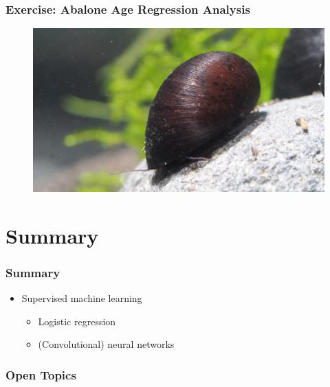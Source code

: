 \documentclass[aspectratio=169]{beamer}
\newcommand\imageright[1]{ %
    \caption*{\scalebox{.5}{\textcolor{lightgray}{\textcopyright~#1}}} %
}
\begin{document}
\begin{frame}
    \frametitle{Exercise: Abalone Age Regression Analysis}
    \begin{figure}
        \centering
        \includegraphics[width=0.7\linewidth]{abalone.jpg}
        \imageright{Garnelaxia}
    \end{figure}
\end{frame}

\section{Summary}
\label{sec:summary}

\begin{frame}
\frametitle{Summary}

\begin{itemize}
    \item Supervised machine learning
    \begin{itemize}
        \item Logistic regression
        \item (Convolutional) neural networks
    \end{itemize}
\end{itemize}
\end{frame}

\begin{frame}
\frametitle{Open Topics}
\end{frame}
\end{document}
